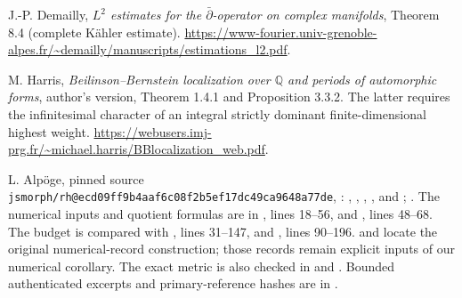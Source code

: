 J.-P. Demailly, \emph{$L^2$ estimates for the $\bar\partial$-operator
on complex manifolds}, Theorem 8.4 (complete K\"ahler estimate).
\url{https://www-fourier.univ-grenoble-alpes.fr/~demailly/manuscripts/estimations_l2.pdf}.

M. Harris, \emph{Beilinson--Bernstein localization over $\mathbb Q$
and periods of automorphic forms}, author's version, Theorem 1.4.1
and Proposition 3.3.2.  The latter requires the infinitesimal character
of an integral strictly dominant finite-dimensional highest weight.
\url{https://webusers.imj-prg.fr/~michael.harris/BBlocalization_web.pdf}.

L. Alp\"oge, pinned source
\texttt{jsmorph/rh@ecd09ff9b4aaf6c08f2b5ef17dc49ca9648a77de},
:
,
,
,
, and
;
.
The numerical inputs and quotient formulas are in
, lines 18--56, and
, lines 48--68.
The budget is compared with
, lines 31--147, and
, lines 90--196.
 and  locate the
original numerical-record construction; those records remain
explicit inputs of our numerical corollary.
The exact metric is also checked in
 and
.
Bounded authenticated excerpts and primary-reference hashes are in
.
